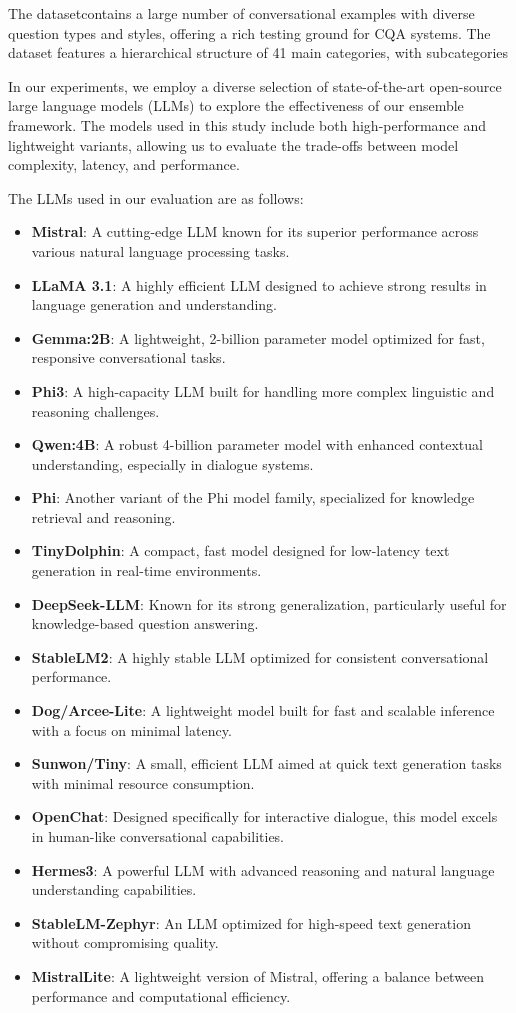 \documentclass[sigconf,authordraft]{acmart}
\begin{document}
The  datasetcontains a large number of conversational examples with diverse question types and styles, offering a rich testing ground for CQA systems. The dataset features a hierarchical structure of 41 main categories, with subcategories

In our experiments, we employ a diverse selection of state-of-the-art open-source large language models (LLMs) to explore the effectiveness of our ensemble framework. The models used in this study include both high-performance and lightweight variants, allowing us to evaluate the trade-offs between model complexity, latency, and performance.

The LLMs used in our evaluation are as follows:

\begin{itemize} \item \textbf{Mistral}: A cutting-edge LLM known for its superior performance across various natural language processing tasks. \item \textbf{LLaMA 3.1}: A highly efficient LLM designed to achieve strong results in language generation and understanding. \item \textbf{Gemma:2B}: A lightweight, 2-billion parameter model optimized for fast, responsive conversational tasks. \item \textbf{Phi3}: A high-capacity LLM built for handling more complex linguistic and reasoning challenges. \item \textbf{Qwen:4B}: A robust 4-billion parameter model with enhanced contextual understanding, especially in dialogue systems. \item \textbf{Phi}: Another variant of the Phi model family, specialized for knowledge retrieval and reasoning. \item \textbf{TinyDolphin}: A compact, fast model designed for low-latency text generation in real-time environments. \item \textbf{DeepSeek-LLM}: Known for its strong generalization, particularly useful for knowledge-based question answering. \item \textbf{StableLM2}: A highly stable LLM optimized for consistent conversational performance. \item \textbf{Dog/Arcee-Lite}: A lightweight model built for fast and scalable inference with a focus on minimal latency. \item \textbf{Sunwon/Tiny}: A small, efficient LLM aimed at quick text generation tasks with minimal resource consumption. \item \textbf{OpenChat}: Designed specifically for interactive dialogue, this model excels in human-like conversational capabilities. \item \textbf{Hermes3}: A powerful LLM with advanced reasoning and natural language understanding capabilities. \item \textbf{StableLM-Zephyr}: An LLM optimized for high-speed text generation without compromising quality. \item \textbf{MistralLite}: A lightweight version of Mistral, offering a balance between performance and computational efficiency. \end{itemize}
\end{document}
